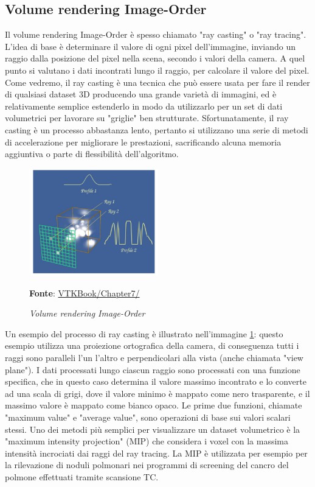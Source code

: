 \subsection{Volume rendering Image-Order}\label{sec:volume-image-order}
Il volume rendering Image-Order è spesso chiamato "ray casting" o "ray tracing". L'idea di base è determinare il valore di ogni pixel dell'immagine, inviando un raggio dalla posizione del pixel nella scena, secondo i valori della camera. A quel punto si  valutano i dati incontrati lungo il raggio, per calcolare il valore del pixel. Come vedremo, il ray casting è una tecnica che può essere usata per fare il render di qualsiasi dataset 3D producendo una grande varietà di immagini, ed è relativamente semplice estenderlo in modo da utilizzarlo per un set di dati volumetrici per lavorare su "griglie" ben strutturate. Sfortunatamente, il ray casting è un processo abbastanza lento, pertanto si utilizzano una serie di metodi di accelerazione per migliorare le prestazioni, sacrificando alcuna memoria aggiuntiva o parte di flessibilità dell'algoritmo.

\begin{figure}[h]
    \centering
    \includegraphics[width=0.5\textwidth]{immagini/volumerendering/imageorder.png}
    \caption{\textit{Volume rendering Image-Order}}
    \textbf{Fonte}: \href{https://lorensen.github.io/VTKExamples/site/VTKBook/07Chapter7/}{VTKBook/Chapter7/}
    \label{fig: Volume Rendering Image-Order}
\end{figure}

Un esempio del processo di ray casting è illustrato nell'immagine \ref{fig: Volume Rendering Image-Order}: questo esempio utilizza una proiezione ortografica della camera, di conseguenza tutti i raggi sono paralleli l'un l'altro e perpendicolari alla vista (anche chiamata "view plane").
I dati processati lungo ciascun raggio sono processati con una funzione specifica, che in questo caso determina il valore massimo incontrato e lo converte ad una scala di grigi, dove il valore minimo è mappato come nero trasparente, e il massimo valore è mappato come bianco opaco. Le prime due funzioni, chiamate "maximum value" e "average value", sono operazioni di base sui valori scalari stessi. Uno dei metodi più semplici per visualizzare un dataset volumetrico è la "maximum intensity projection" (MIP) che considera i voxel con la massima intensità incrociati dai raggi del ray tracing. La MIP è utilizzata per esempio per la rilevazione di noduli polmonari nei programmi di screening del cancro del polmone effettuati tramite scansione TC.


